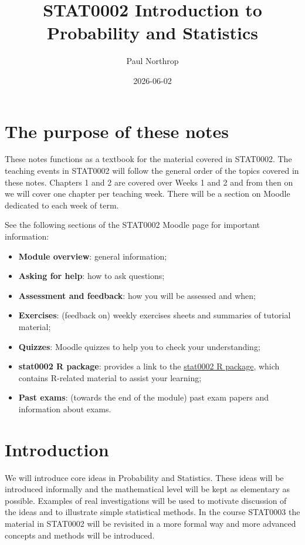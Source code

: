 \documentclass[
  british,
  11pt,
  openany, a4paper]{book}
\title{STAT0002 Introduction to Probability and Statistics}
\author{Paul Northrop}
\date{2026-06-02}
\providecommand{\tightlist}{%
  \setlength{\itemsep}{0pt}\setlength{\parskip}{0pt}}
\begin{document}
\maketitle

{
\setcounter{tocdepth}{1}
\tableofcontents
}
\chapter*{The purpose of these notes}\label{the-purpose-of-these-notes}

These notes functions as a textbook for the material covered in STAT0002. The teaching events in STAT0002 will follow the general order of the topics covered in these notes. Chapters 1 and 2 are covered over Weeks 1 and 2 and from then on we will cover one chapter per teaching week. There will be a section on Moodle dedicated to each week of term.

See the following sections of the STAT0002 Moodle page for important information:

\begin{itemize}
\tightlist
\item
  \textbf{Module overview}: general information;
\item
  \textbf{Asking for help}: how to ask questions;
\item
  \textbf{Assessment and feedback}: how you will be assessed and when;
\item
  \textbf{Exercises}: (feedback on) weekly exercises sheets and summaries of tutorial material;
\item
  \textbf{Quizzes}: Moodle quizzes to help you to check your understanding;
\item
  \textbf{stat0002 R package}: provides a link to the \href{https://paulnorthrop.github.io/stat0002/}{stat0002 R package}, which contains R-related material to assist your learning;
\item
  \textbf{Past exams}: (towards the end of the module) past exam papers and information about exams.
\end{itemize}

\chapter{Introduction}\label{introduction}

We will introduce core ideas in Probability and Statistics. These ideas will be introduced informally and the mathematical level will be kept as elementary as possible. Examples of real investigations will be used to motivate discussion of the ideas and to illustrate simple statistical methods. In the course STAT0003 the material in STAT0002 will be revisited in a more formal way and more advanced concepts and methods will be introduced.
\end{document}
